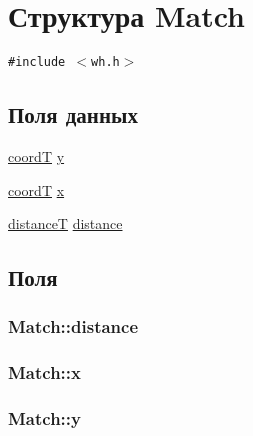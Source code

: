 \hypertarget{struct_match}{
\section{Структура Match}
\label{struct_match}
}
{\tt \#include $<$wh.h$>$}

\subsection*{Поля данных}
\begin{CompactItemize}
\item 
\hyperlink{walsh__hadamard__run_2pm_2whimport_8h_f75219364b309824eef21d65e9edc43d}{coordT} \hyperlink{struct_match_ac261c7d61612fef8a7d7805df6e8fe7}{y}
\item 
\hyperlink{walsh__hadamard__run_2pm_2whimport_8h_f75219364b309824eef21d65e9edc43d}{coordT} \hyperlink{struct_match_c0b4479ebf77f473efd125db2ed55de0}{x}
\item 
\hyperlink{walsh__hadamard__run_2pm_2whimport_8h_c1c41d7d1d0ed2da28d8a632864fdd86}{distanceT} \hyperlink{struct_match_9941c599c83bff4304019d644daea2ac}{distance}
\end{CompactItemize}


\subsection{Поля}
\hypertarget{struct_match_9941c599c83bff4304019d644daea2ac}{
\subsubsection[{distance}]{ {\bf Match::distance}}}
\label{struct_match_9941c599c83bff4304019d644daea2ac}


\hypertarget{struct_match_c0b4479ebf77f473efd125db2ed55de0}{
\subsubsection[{x}]{ {\bf Match::x}}}
\label{struct_match_c0b4479ebf77f473efd125db2ed55de0}


\hypertarget{struct_match_ac261c7d61612fef8a7d7805df6e8fe7}{
\subsubsection[{y}]{ {\bf Match::y}}}
\label{struct_match_ac261c7d61612fef8a7d7805df6e8fe7}




